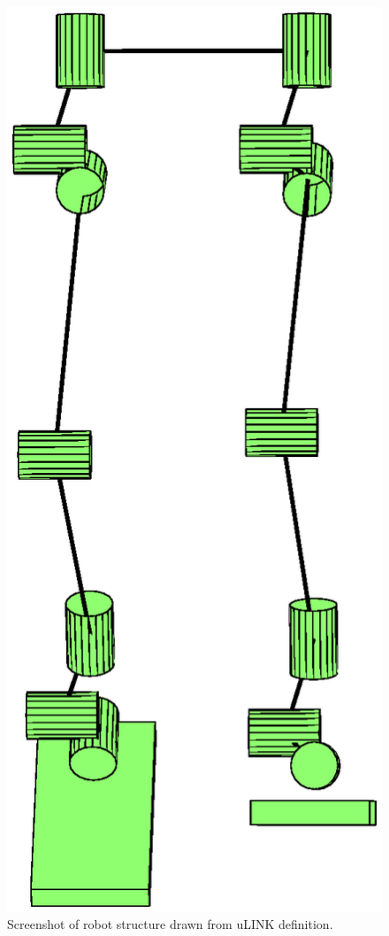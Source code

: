 \begin{figure}[!ht]
	\begin{center}
    \includegraphics[scale=0.6]{fig/ch4/ulinkdrawn.eps}
	\end{center}
  \caption{Screenshot of robot structure drawn from uLINK definition.}
\end{figure}

